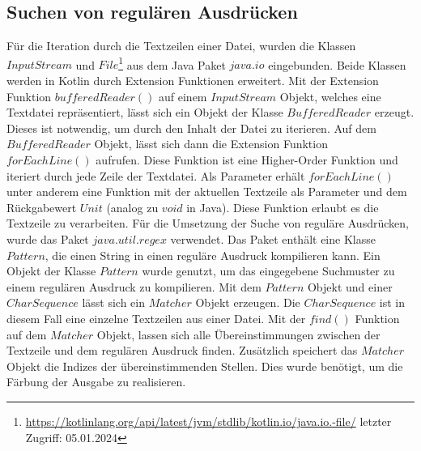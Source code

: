 \documentclass{article}
\begin{document}
\subsection{Suchen von regulären Ausdrücken}
Für die Iteration durch die Textzeilen einer Datei, wurden die Klassen $InputStream$ und $File$\footnote{\url{https://kotlinlang.org/api/latest/jvm/stdlib/kotlin.io/java.io.-file/} letzter Zugriff: 05.01.2024} aus dem Java Paket $java.io$ eingebunden. Beide Klassen werden in Kotlin durch Extension Funktionen erweitert. Mit der Extension Funktion $bufferedReader()$ auf einem $InputStream$ Objekt, welches eine Textdatei repräsentiert, lässt sich ein Objekt der Klasse $BufferedReader$ erzeugt. Dieses ist notwendig, um durch den Inhalt der Datei zu iterieren. Auf dem $BufferedReader$ Objekt, lässt sich dann die Extension Funktion $forEachLine()$ aufrufen. Diese Funktion ist eine Higher-Order Funktion und iteriert durch jede Zeile der Textdatei. Als Parameter erhält $forEachLine()$ unter anderem eine Funktion mit der aktuellen Textzeile als Parameter und dem Rückgabewert $Unit$ (analog zu $void$ in Java). Diese Funktion erlaubt es die Textzeile zu verarbeiten. \newline
Für die Umsetzung der Suche von reguläre Ausdrücken, wurde das Paket $java.util.regex$ verwendet. Das Paket enthält eine Klasse $Pattern$, die einen String in einen reguläre Ausdruck kompilieren kann. Ein Objekt der Klasse $Pattern$ wurde genutzt, um das eingegebene Suchmuster zu einem regulären Ausdruck zu kompilieren. Mit dem $Pattern$ Objekt und einer $CharSequence$ lässt sich ein $Matcher$ Objekt erzeugen. Die $CharSequence$ ist in diesem Fall eine einzelne Textzeilen aus einer Datei. Mit der $find()$ Funktion auf dem $Matcher$ Objekt, lassen sich alle Übereinstimmungen zwischen der Textzeile und dem regulären Ausdruck finden. Zusätzlich speichert das $Matcher$ Objekt die Indizes der übereinstimmenden Stellen. Dies wurde benötigt, um die Färbung der Ausgabe zu realisieren.
\end{document}
